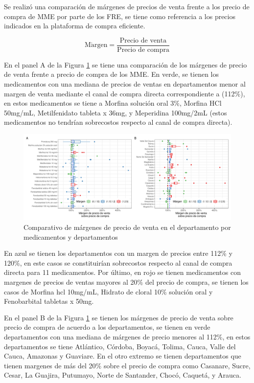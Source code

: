 \documentclass[
]{book}
\begin{document}
Se realizó una comparación de márgenes de precios de venta frente a los precio de compra de MME por parte de los FRE, se tiene como referencia a los precios indicados en la plataforma de compra eficiente.

\[\mathrm{M\acute{a}rgen} = \frac{\text{Precio de venta}}{\text{Precio de compra}}\]

En el panel A de la Figura \ref{fig:boxplotComparativoPVTA} se tiene una comparación de los márgenes de precio de venta frente a precio de compra de los MME. En verde, se tienen los medicamentos con una mediana de precios de ventas en departamentos menor al margen de venta mediante el canal de compra directa correspondiente a (112\%), en estos medicamentos se tiene a Morfina solución oral 3\%, Morfina HCl 50mg/mL, Metilfenidato tableta x 36mg, y Meperidina 100mg/2mL (estos medicamentos no tendrían sobrecostos respecto al canal de compra directa).

\begin{figure}[t]
\includegraphics[width=1\linewidth]{InformeFinal_files/figure-latex/boxplotComparativoPVTA-1} \caption{Comparativo de márgenes de precio de venta en el departamento por medicamentos y departamentos}\label{fig:boxplotComparativoPVTA}
\end{figure}

En azul se tienen los departamentos con un margen de precios entre 112\% y 120\%, en este casos se constituirían sobrecostos respecto al canal de compra directa para 11 medicamentos. Por último, en rojo se tienen medicamentos con margenes de precios de ventas mayores al 20\% del precio de compra, se tienen los casos de Morfina hcl 10mg/mL, Hidrato de cloral 10\% solución oral y Fenobarbital tabletas x 50mg.

En el panel B de la Figura \ref{fig:boxplotComparativoPVTA} se tienen los márgenes de precio de venta sobre precio de compra de acuerdo a los departamentos, se tienen en verde departamentos con una mediana de márgenes de precio menores al 112\%, en estos departamentos se tiene Atlántico, Córdoba, Boyacá, Tolima, Cauca, Valle del Cauca, Amazonas y Guaviare. En el otro extremo se tienen departamentos que tienen margenes de más del 20\% sobre el precio de compra como Casanare, Sucre, Cesar, La Guajira, Putumayo, Norte de Santander, Chocó, Caquetá, y Arauca.
\end{document}
